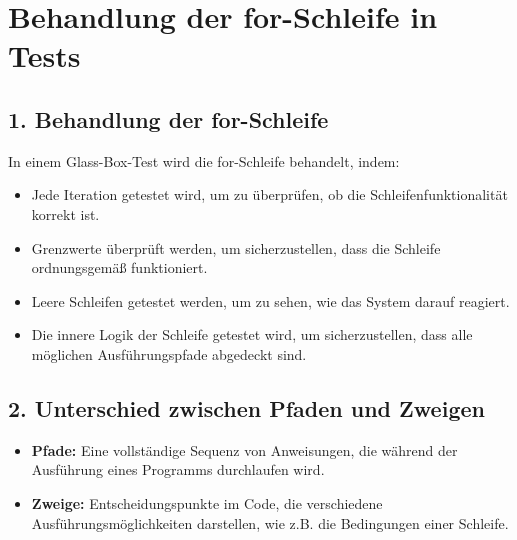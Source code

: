 \documentclass[main.tex]{subfiles}
\begin{document}
\section*{Behandlung der for-Schleife in Tests}

\subsection*{1. Behandlung der for-Schleife}
In einem Glass-Box-Test wird die for-Schleife behandelt, indem:
\begin{itemize}
    \item Jede Iteration getestet wird, um zu überprüfen, ob die Schleifenfunktionalität korrekt ist.
    \item Grenzwerte überprüft werden, um sicherzustellen, dass die Schleife ordnungsgemäß funktioniert.
    \item Leere Schleifen getestet werden, um zu sehen, wie das System darauf reagiert.
    \item Die innere Logik der Schleife getestet wird, um sicherzustellen, dass alle möglichen Ausführungspfade abgedeckt sind.
\end{itemize}

\subsection*{2. Unterschied zwischen Pfaden und Zweigen}
\begin{itemize}
    \item \textbf{Pfade:} Eine vollständige Sequenz von Anweisungen, die während der Ausführung eines Programms durchlaufen wird.
    \item \textbf{Zweige:} Entscheidungspunkte im Code, die verschiedene Ausführungsmöglichkeiten darstellen, wie z.B. die Bedingungen einer Schleife.
\end{itemize}
\end{document}
